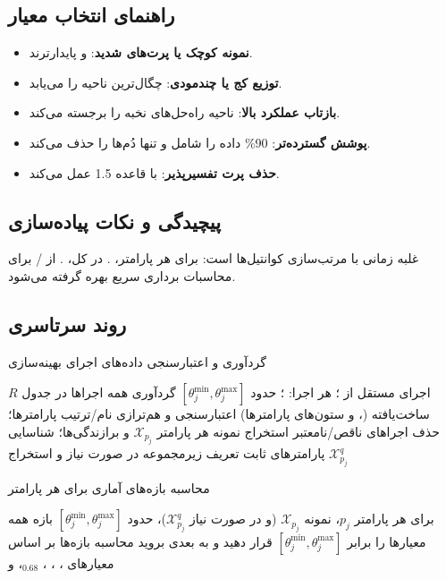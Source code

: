 \subsection{راهنمای انتخاب معیار}
\begin{itemize}
    \item \textbf{نمونه کوچک یا پرت‌های شدید}:  و  پایدارترند.
    \item \textbf{توزیع کج یا چندمودی}:  چگال‌ترین ناحیه را می‌یابد.
    \item \textbf{بازتاب عملکرد بالا}:  ناحیه راه‌حل‌های نخبه را برجسته می‌کند.
    \item \textbf{پوشش گسترده‌تر}:  90\% داده را شامل و تنها دُم‌ها را حذف می‌کند.
    \item \textbf{حذف پرت تفسیرپذیر}:  با قاعده 1.5  عمل می‌کند.
\end{itemize}

\subsection{پیچیدگی و نکات پیاده‌سازی}
غلبه زمانی با مرتب‌سازی کوانتیل‌ها است: برای هر پارامتر، . در کل، . از / برای محاسبات برداری سریع بهره گرفته می‌شود.

\subsection{روند سرتاسری}
\begin{algorithm}[H]
\caption{گردآوری و اعتبارسنجی داده‌های اجرای بهینه‌سازی}
\begin{algorithmic}[1]
\REQUIRE $R$ اجرای مستقل از ؛ هر اجرا: ؛ حدود $[\theta_j^{\min},\theta_j^{\max}]$
\STATE گردآوری همه اجراها در جدول ساخت‌یافته (،  و ستون‌های پارامترها)
\STATE اعتبارسنجی و هم‌ترازی نام/ترتیب پارامترها؛ حذف اجراهای ناقص/نامعتبر
\STATE استخراج نمونه هر پارامتر $\mathcal{X}_{p_j}$ و برازندگی‌ها؛ شناسایی پارامترهای ثابت
\STATE تعریف زیرمجموعه  در صورت نیاز و استخراج $\mathcal{X}^{q}_{p_j}$
\end{algorithmic}
\end{algorithm}

\begin{algorithm}[H]
\caption{محاسبه بازه‌های آماری برای هر پارامتر}
\begin{algorithmic}[1]
\REQUIRE برای هر پارامتر $p_j$، نمونه $\mathcal{X}_{p_j}$ (و در صورت نیاز $\mathcal{X}^{q}_{p_j}$)، حدود $[\theta_j^{\min}, \theta_j^{\max}]$
        \STATE بازه همه معیارها را برابر $[\theta_j^{\min}, \theta_j^{\max}]$ قرار دهید و به بعدی بروید
    \ENDIF
    \STATE محاسبه بازه‌ها بر اساس معیارهای ، ، ، $_{0.68}$،  و 
\ENDFOR
\end{algorithmic}
\end{algorithm}

